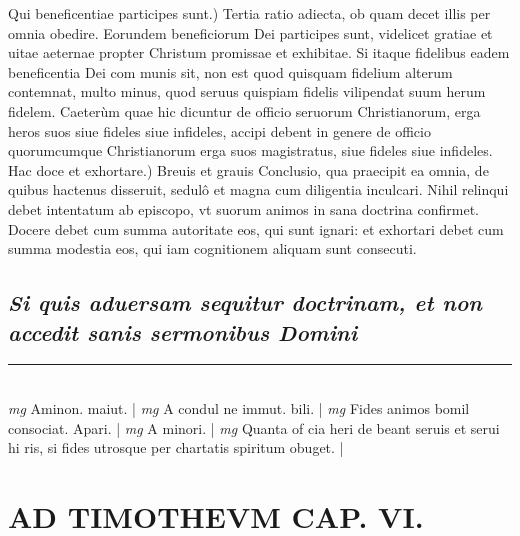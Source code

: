 \documentclass{article}
\begin{document}
\begin{pages}
 \pend\pstart Qui beneficentiae participes sunt.) Tertia ratio adiecta, ob quam decet illis per omnia obedire. Eorundem beneficiorum Dei participes sunt, videlicet gratiae et uitae aeternae propter Christum promissae et exhibitae. Si itaque fidelibus eadem beneficentia Dei com munis sit, non est quod quisquam fidelium alterum contemnat, multo minus, quod seruus quispiam fidelis vilipendat suum herum fidelem. Caeterùm quae hic dicuntur de officio seruorum Christianorum, erga heros suos siue fideles siue infideles, accipi debent in genere de officio quorumcumque Christianorum erga suos magistratus, siue fideles siue infideles.  \pend\pstart Hac doce et exhortare.) Breuis et grauis Conclusio, qua praecipit ea omnia, de quibus hactenus disseruit, sedulô et magna cum diligentia inculcari. Nihil relinqui debet intentatum ab episcopo, vt suorum animos in sana doctrina confirmet. Docere debet cum summa autoritate eos, qui sunt ignari: et exhortari debet cum summa modestia eos, qui iam cognitionem aliquam sunt consecuti.  \pend
{}
{}
\subsection*{\textit{Si quis aduersam sequitur doctrinam, et non accedit sanis sermonibus Domini }}\pstart  \pend
\vspace{0.5cm}\noindent
\vspace{0.2cm}\rule{1cm}{0.2pt}\\ 
\hspace{0.2cm}\textit{mg}
\footnotesize Aminon. maiut. 
\normalsize| 
\hspace{0.2cm}\textit{mg}
\footnotesize A condul ne immut. bili. 
\normalsize| 
\hspace{0.2cm}\textit{mg}
\footnotesize Fides animos bomil consociat. Apari. 
\normalsize| 
\hspace{0.2cm}\textit{mg}
\footnotesize A minori. 
\normalsize| 
\hspace{0.2cm}\textit{mg}
\footnotesize Quanta of cia heri de beant seruis et serui hi ris, si fides utrosque per chartatis spiritum obuget. 
\normalsize| 
\section*{AD TIMOTHEVM CAP. VI. }
\marginpar{[ p.122 ]}
{}

\end{pages}
\end{document}
